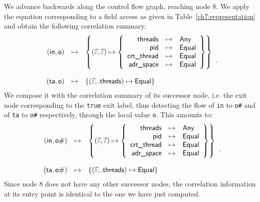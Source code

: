\documentclass[11pt]{article}
\newcommand{\disp}[1]{\lstinline&#1&}
\begin{document}
We advance backwards along the control flow graph, reaching node 8. We apply the 
equation corresponding to a field access as given in Table~\ref{ch7:representation}  
and obtain the following correlation summary:
\newcommand{\tsf}[1]{\textsf{#1}}
%
\[
\begin{array}{rll}
(\tsf{in}, \tsf{o}) &\mapsto 
           &\left\{ (\pempty, \pempty) \mapsto
           \left\{\begin{array}{rll}
           \textrm{\tsf{threads}} &\mapsto &\qmark \\
           \textrm{\tsf{pid}} &\mapsto &\equal \\
           \textrm{\tsf{crt\_thread}} &\mapsto &\equal \\
           \textrm{\tsf{adr\_space}} &\mapsto&\equal
           \end{array}\right\}\right\} \\\\
(\tsf{ta},\tsf{o}) & \mapsto &\{(\pempty, .\tsf{threads}) \mapsto \equal\}
\end{array}.
\]
% 
\noindent We compose it with the correlation summary of its successor node, i.e. the
exit node corresponding to the \disp{true} exit label, thus detecting the flow
of \disp{in} to \disp{o#} and of \disp{ta} to \disp{o#} respectively, through 
the local value \disp{o}. This amounts to:
\[
\begin{array}{rll}
(\textsf{in}, \textsf{o\#}) &\mapsto 
           &\left\{ (\pempty, \pempty) \mapsto
           \left\{\begin{array}{rll}
           \textrm{\tsf{threads}} &\mapsto &\qmark \\
           \textrm{\tsf{pid}} &\mapsto &\equal \\
           \textrm{\tsf{crt\_thread}} &\mapsto &\equal \\
           \textrm{\tsf{adr\_space}} &\mapsto&\equal
           \end{array}\right\}\right\} \\\\
(\tsf{ta}, \tsf{o\#}) & \mapsto &\{(\pempty, .\tsf{threads}) \mapsto \equal\}
\end{array}.
\]   
Since node 8 does not have any other successor nodes, the correlation 
information at its entry point is identical to the one we have just computed.
\end{document}
